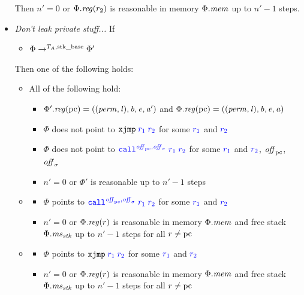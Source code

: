\documentclass[a4paper]{article}
\begin{document}
\begin{definition}
\begin{itemize}
\begin{itemize}
    \end{itemize}
    Then $n' = 0$ or $\Phi.\reg(r_2)$ is reasonable in memory $\Phi.\mem$ up to $n' -1$ steps.
  \item \emph{Don't leak private stuff...} If
    \begin{itemize}
    \item $\Phi \step[\ta,\stkb] \Phi'$
    \end{itemize}
    Then one of the following holds:
    \begin{itemize}
    \item All of the following hold:
      \begin{itemize}
      \item $\Phi'.\reg(\pcreg) =
        ((\perm,\lin),\baddr,\eaddr,\aaddr')$ and $\Phi.\reg(\pcreg) =
        ((\perm,\lin),\baddr,\eaddr,\aaddr)$
      \item $\Phi$ does not point to $\src{\txjmp{r_1}{r_2}}$ for some $\src{r_1}$ and $\src{r_2}$
      \item $\Phi$ does not point to $\src{\scall{\offpc,\offsigma}{r_1}{r_2}}$ for some $\src{r_1}$ and $\src{r_2}$, $\offpc$, $\offsigma$
      \item $n' = 0$ or $\Phi'$ is reasonable up to $n'-1$ steps
      \end{itemize}
    \item
      \begin{itemize}
      \item $\Phi$ points to $\src{\scall{\offpc,\offsigma}{r_1}{r_2}}$ for some $\src{r_1}$ and $\src{r_2}$
      \item $n' = 0$ or $\Phi.\reg(r)$ is reasonable in memory $\Phi.\mem$ and free stack $\Phi.\ms_\stk$ up to $n'-1$ steps for all $r \neq \pcreg$
      \end{itemize}
    \item
      \begin{itemize}
      \item $\Phi$ points to $\src{\txjmp{r_1}{r_2}}$ for some $\src{r_1}$ and $\src{r_2}$
      \item $n' = 0$ or $\Phi.\reg(r)$ is reasonable in memory $\Phi.\mem$ and free stack $\Phi.\ms_\stk$ up to $n'-1$ steps for all $r \neq \pcreg$
      \end{itemize}
    \end{itemize}
  \end{itemize}
\end{definition}
\end{document}
